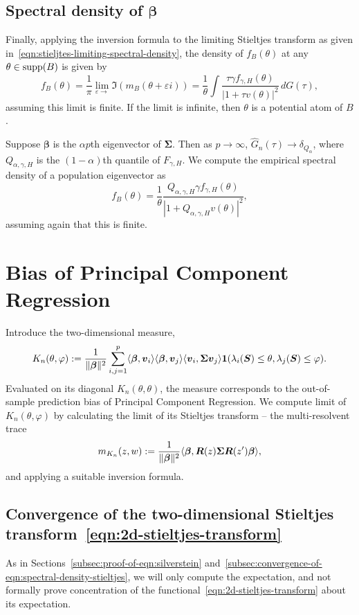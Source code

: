 \documentclass{article}
\newcommand{\bv}{\boldsymbol{v}}
\newcommand{\bbeta}{\boldsymbol{\beta}}
\newcommand{\bSigma}{\boldsymbol{\Sigma}}
\newcommand{\bS}{\boldsymbol{S}}
\newcommand{\bR}{\boldsymbol{R}}
\begin{document}
\subsection{Spectral density of $\bbeta$}
Finally, applying the inversion formula to the limiting Stieltjes transform as given in~\eqref{eqn:stieljtes-limiting-spectral-density}, the density of $f_{B}(\theta)$ at any $\theta \in \mathrm{supp}(B)$ is given by
$$
f_{B}(\theta) = \frac{1}{\pi}\lim_{\varepsilon \to} \Im(m_B(\theta + \varepsilon i)) = \frac{1}{\theta} \int \frac{\tau \gamma f_{\gamma,H}(\theta)}{|1 + \tau v(\theta)|^2} \,dG(\tau),
$$
assuming this limit is finite. If the limit is infinite, then $\theta$ is a potential atom of $B$. 

Suppose $\bbeta$ is the $\alpha p$th eigenvector of $\bSigma$. Then as $p \to \infty$, $\hat{G}_n(\tau) \to \delta_{Q_{\alpha}}$, where $Q_{\alpha,\gamma,H}$ is the $(1 - \alpha)$th quantile of $F_{\gamma,H}$. We compute the empirical spectral density of a population eigenvector as
$$
f_{B}(\theta) = \frac{1}{\theta} \frac{Q_{\alpha,\gamma,H} \gamma f_{\gamma,H}(\theta)}{|1 + Q_{\alpha,\gamma,H} v(\theta)|^2},
$$
assuming again that this is finite.

\section{Bias of Principal Component Regression}
Introduce the two-dimensional measure,
\begin{equation}
	\label{eqn:}
	K_n(\theta,\varphi) := \frac{1}{\|\bbeta\|^2} \sum_{i,j = 1}^{p} \dotp{\bbeta}{\bv_i} \dotp{\bbeta}{\bv_j} \dotp{\bv_i}{\bSigma \bv_{j}} \1(\lambda_i(\bS) \leq \theta, \lambda_j(\bS) \leq \varphi).
\end{equation}
Evaluated on its diagonal $K_n(\theta,\theta)$, the measure corresponds to the out-of-sample prediction bias of Principal Component Regression. We compute limit of $K_n(\theta,\varphi)$ by calculating the limit of its Stieltjes transform -- the multi-resolvent trace
\begin{equation}
	\label{eqn:2d-stieltjes-transform}
	m_{K_n}(z,w) := \frac{1}{\|\bbeta\|^2} \dotp{\bbeta}{\bR(z) \bSigma \bR(z') \bbeta},
\end{equation}
and applying a suitable inversion formula.

\subsection{Convergence of the two-dimensional Stieltjes transform~\eqref{eqn:2d-stieltjes-transform}}
As in Sections~\ref{subsec:proof-of-eqn:silverstein} and~\ref{subsec:convergence-of-eqn:spectral-density-stieltjes}, we will only compute the expectation, and not formally prove concentration of the functional~\eqref{eqn:2d-stieltjes-transform} about its expectation.
\end{document}

